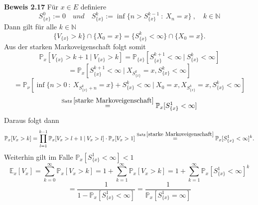 \textbf{Beweis 2.17}
Für $x \in E$ definiere 
\begin{equation*}
S_{\lbrace x \rbrace}^{0} := 0 \quad und \quad S_{\lbrace x \rbrace}^{k} := \inf \lbrace n > S_{\lbrace x \rbrace}^{k-1} \: : \: X_{n} = x \rbrace \: , \quad k \in \mathbb{N}
\end{equation*}
Dann gilt für alle $k \in \mathbb{N}$
\begin{equation*}
\lbrace V_{ \lbrace x \rbrace} > k \rbrace \cap \lbrace X_{0} = x \rbrace = \lbrace S_{\lbrace x \rbrace}^{k} < \infty \rbrace \cap \lbrace X_{0} = x \rbrace .
\end{equation*}
Aus der starken Markoveigenschaft folgt somit
\begin{equation*}
\mathbb{P}_{x}[V_{ \lbrace x \rbrace} > k+1 \: | \: V_{ \lbrace x \rbrace} > k] = \mathbb{P}_{\lbrace x \rbrace}[S_{\lbrace x \rbrace}^{k+1} < \infty \: | \: S_{\lbrace x \rbrace}^{k} < \infty] 
\end{equation*}
\begin{equation*}
= \mathbb{P}_{x}[S_{\lbrace x \rbrace}^{k+1} < \infty \: | \: X_{S_{\lbrace x \rbrace}^{k}} = x, S_{\lbrace x \rbrace}^{k} < \infty]
\end{equation*}
\begin{equation*}
= \mathbb{P}_{\nu}[\inf \lbrace n>0 \: : \: X_{S_{\lbrace x \rbrace}^{k} + n} = x \rbrace + S_{\lbrace x \rbrace}^{k} < \infty  \: | \: X_{0} = x,X_{S_{\lbrace x \rbrace}^{k}} = x, S_{\lbrace x \rbrace}^{k} < \infty]
\end{equation*}
\begin{equation*}
\stackrel{\mathrm{Satz} \: \ref{starke Markoveigenschaft}}{=} \mathbb{P}_{x}[S_{\lbrace x \rbrace}^{1} < \infty]
\end{equation*}
Daraus folgt dann
\begin{equation*}
\mathbb{P}_{x}[V_{x} > k] = \prod_{l=1}^{k-1} \mathbb{P}_{x}[V_{x} > l + 1 \: | \: V_{x} > l] \cdot \mathbb{P}_{x}[V_{x} > 1] \stackrel{\mathrm{Satz} \: \ref{starke Markoveigenschaft}}{=} \mathbb{P}_{x}[S_{\lbrace x \rbrace}^{1} < \infty]^{k}.
\end{equation*}
Weiterhin gilt im Falle $\mathbb{P}_{x}[S_{\lbrace x \rbrace}^{1} < \infty] < 1$
\begin{equation*}
\mathbb{E}_{x}[V_{x}] = \sum_{k=0}^{\infty}\mathbb{P}_{x}[V_{x} > k] = 1 + \sum_{k=1}^{\infty}\mathbb{P}_{x}[V_{x} > k] = 1 + \sum_{k=1}^{\infty}\mathbb{P}_{x}[S_{\lbrace x \rbrace}^{1} < \infty]^{k}
\end{equation*}
\begin{equation*}
= \dfrac{1}{1-\mathbb{P}_{x}[S_{\lbrace x \rbrace}^{1} < \infty]} = \dfrac{1}{\mathbb{P}_{x}[S_{\lbrace x \rbrace}^{1} = \infty]}
\end{equation*}


